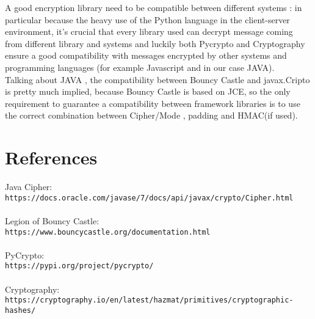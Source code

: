 \documentclass{article}
\begin{document}
A good encryption library need to be compatible between different systems : in particular because the heavy use of the Python language in the client-server environment, it's crucial that every library used can decrypt message coming from different library and systems and luckily both Pycrypto and Cryptography ensure a good compatibility with messages encrypted by other systems and programming languages (for example Javascript and in our case JAVA).\\
Talking about JAVA , the compatibility between Bouncy Castle and javax.Cripto is pretty much implied, because Bouncy Castle is based on JCE, so the only requirement to guarantee a compatibility between framework libraries is to use the correct combination between Cipher/Mode , padding and HMAC(if used).

\section{References}

	Java Cipher:\\
	 \verb|https://docs.oracle.com/javase/7/docs/api/javax/crypto/Cipher.html|\\
	 \\Legion of Bouncy Castle:\\
	 \verb|https://www.bouncycastle.org/documentation.html|\\
	\\PyCrypto:\\
	 \verb|https://pypi.org/project/pycrypto/|\\
	 \\Cryptography:\\
	 \verb|https://cryptography.io/en/latest/hazmat/primitives/cryptographic-hashes/|\\
\end{document}
